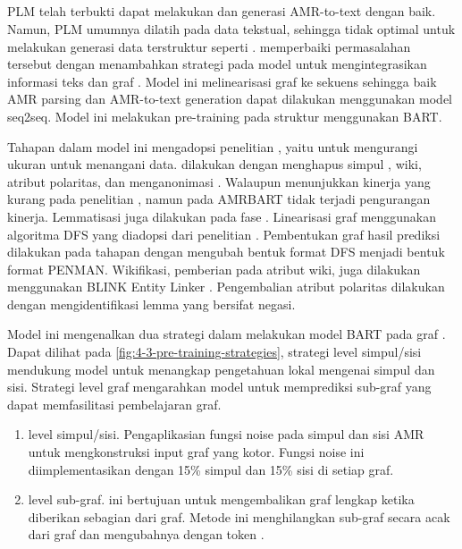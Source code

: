 \subsection{ }

\Gls{PLM} telah terbukti dapat melakukan  \amrparsing{} dan generasi AMR-to-text dengan baik.
Namun, \gls{PLM} umumnya dilatih pada data tekstual, sehingga tidak optimal untuk melakukan generasi data terstruktur seperti \AMR{}.
\textcite{bai2022} memperbaiki permasalahan tersebut dengan menambahkan strategi \pretraining{} pada model untuk mengintegrasikan informasi teks dan graf \AMR{}.
Model ini melinearisasi graf \AMR{} ke sekuens sehingga baik AMR parsing dan AMR-to-text generation dapat dilakukan menggunakan model \gls{seq2seq}.
Model ini melakukan pre-training pada struktur \AMR{} menggunakan \gls{BART}.

Tahapan  dalam model ini mengadopsi penelitian \textcite{bevilacqua2021}, yaitu  untuk mengurangi ukuran  untuk menangani  data.
 dilakukan dengan menghapus simpul ,  wiki, atribut polaritas, dan menganonimasi .
Walaupun  menunjukkan kinerja yang kurang pada penelitian \textcite{bevilacqua2021}, namun pada \gls{AMRBART} tidak terjadi pengurangan kinerja.
Lemmatisasi juga dilakukan pada fase .
Linearisasi graf menggunakan algoritma \gls{DFS} yang diadopsi dari penelitian \textcite{bevilacqua2021}.
Pembentukan graf \AMR{} hasil prediksi dilakukan pada tahapan  dengan mengubah bentuk format \gls{DFS} menjadi bentuk format PENMAN.
Wikifikasi, pemberian  pada atribut wiki, juga dilakukan menggunakan BLINK Entity Linker .
Pengembalian atribut polaritas dilakukan dengan mengidentifikasi lemma yang bersifat negasi.

Model ini mengenalkan dua strategi  dalam melakukan \pretraining{} model \gls{BART} pada graf \AMR{}.
Dapat dilihat pada \cref{fig:4-3-pre-training-strategies}, strategi level \denoising{} simpul/sisi mendukung model untuk menangkap pengetahuan lokal mengenai simpul dan sisi.
Strategi \denoising{} level graf mengarahkan model untuk memprediksi sub-graf yang dapat memfasilitasi pembelajaran graf.
\begin{enumerate}
  \item \Denoising{} level simpul/sisi.
  Pengaplikasian fungsi noise pada simpul dan sisi AMR untuk mengkonstruksi input graf yang kotor.
  Fungsi noise ini diimplementasikan dengan  15\% simpul dan 15\% sisi di setiap graf.

  \item \Denoising{} level sub-graf.
   ini bertujuan untuk mengembalikan graf lengkap ketika diberikan sebagian dari graf.
  Metode ini menghilangkan sub-graf secara acak dari graf dan mengubahnya dengan token .
\end{enumerate}

